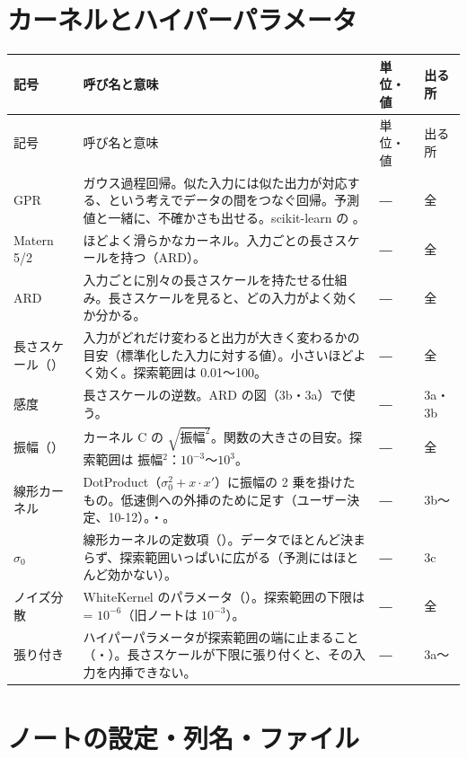 \documentclass[paper=a4paper,fontsize=10.5pt,line_length=44zw,number_of_lines=38]{jlreq}
\makeatletter
\newcommand{\file}[1]{\texttt{\detokenize{#1}}}
\newenvironment{symtab}{%
  \begin{longtable}{@{}>{\raggedright\arraybackslash}p{6.5\zw}>{\raggedright\arraybackslash}p{22\zw}>{\raggedright\arraybackslash}p{6\zw}>{\raggedright\arraybackslash}p{4.5\zw}@{}}
  \toprule 記号 & 呼び名と意味 & 単位・値 & 出る所 \\ \midrule \endfirsthead
  \toprule 記号 & 呼び名と意味 & 単位・値 & 出る所 \\ \midrule \endhead
  \bottomrule \endlastfoot}{\end{longtable}}
\makeatother
\begin{document}
\section{カーネルとハイパーパラメータ}

\begin{symtab}
GPR & ガウス過程回帰。似た入力には似た出力が対応する、という考えでデータの間をつなぐ回帰。予測値と一緒に、不確かさも出せる。scikit-learn の \file{GaussianProcessRegressor}。 & ― & 全 \\
Matern 5/2 & ほどよく滑らかなカーネル。入力ごとの長さスケールを持つ（ARD）。 & ― & 全 \\
ARD & 入力ごとに別々の長さスケールを持たせる仕組み。長さスケールを見ると、どの入力がよく効くか分かる。 & ― & 全 \\
長さスケール（\file{ls_<入力>}）& 入力がどれだけ変わると出力が大きく変わるかの目安（標準化した入力に対する値）。小さいほどよく効く。探索範囲は 0.01〜100。 & ― & 全 \\
感度 & 長さスケールの逆数。ARD の図（3b・3a）で使う。 & ― & 3a・3b \\
振幅（\file{amplitude}）& カーネル C の $\sqrt{\text{振幅}^2}$。関数の大きさの目安。探索範囲は 振幅$^2$：$10^{-3}$〜$10^{3}$。 & ― & 全 \\
線形カーネル & DotProduct（$\sigma_0^2 + x\cdot x'$）に振幅の 2 乗を掛けたもの。低速側への外挿のために足す（ユーザー決定、10-12）。\file{lin_amplitude}・\file{lin_sigma0}。 & ― & 3b〜 \\
$\sigma_0$ & 線形カーネルの定数項（\file{lin_sigma0}）。データでほとんど決まらず、探索範囲いっぱいに広がる（予測にはほとんど効かない）。 & ― & 3c \\
ノイズ分散 & WhiteKernel のパラメータ（\file{noise_var}）。探索範囲の下限は \file{NOISE_LB} = $10^{-6}$（旧ノートは $10^{-3}$）。 & ― & 全 \\
張り付き & ハイパーパラメータが探索範囲の端に止まること（\file{noise_at_lower_bound}・\file{ls_at_bound}）。長さスケールが下限に張り付くと、その入力を内挿できない。 & ― & 3a〜 \\
\end{symtab}

\section{ノートの設定・列名・ファイル}
\end{document}
